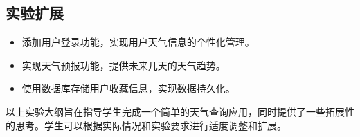 \documentclass[UTF8]{ctexart}
\begin{document}
\subsection{实验扩展}

\begin{itemize}
   \item 添加用户登录功能，实现用户天气信息的个性化管理。
   \item 实现天气预报功能，提供未来几天的天气趋势。
   \item 使用数据库存储用户收藏信息，实现数据持久化。
\end{itemize}
以上实验大纲旨在指导学生完成一个简单的天气查询应用，同时提供了一些拓展性的思考。学生可以根据实际情况和实验要求进行适度调整和扩展。
\end{document}
